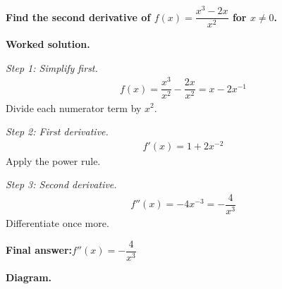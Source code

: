 \documentclass[11pt]{article}
\newcommand{\question}[1]{\par\medskip\noindent\textbf{#1}\par}
\begin{document}
\question{Find the second derivative of \( f(x) = \dfrac{x^3 - 2x}{x^2} \) for \( x \neq 0 \).}

\textbf{Worked solution.}

\textit{Step 1: Simplify first.}
\[\begin{gathered}
f(x) = \dfrac{x^3}{x^2} - \dfrac{2x}{x^2} = x - 2x^{-1}
\end{gathered}\]
Divide each numerator term by \( x^2 \).

\textit{Step 2: First derivative.}
\[\begin{gathered}
f'(x) = 1 + 2x^{-2}
\end{gathered}\]
Apply the power rule.

\textit{Step 3: Second derivative.}
\[\begin{gathered}
f''(x) = -4x^{-3} = -\dfrac{4}{x^3}
\end{gathered}\]
Differentiate once more.

\begin{answerbox}
\textbf{Final answer:}\quad \(\displaystyle  f''(x) = -\dfrac{4}{x^3} \)
\end{answerbox}
\textbf{Diagram.}
\end{document}
